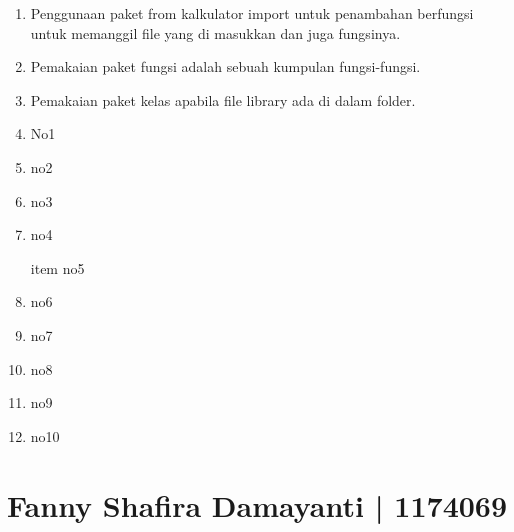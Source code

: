 \begin{enumerate}
\item Penggunaan paket from kalkulator import untuk penambahan berfungsi untuk memanggil file yang di masukkan dan juga fungsinya.


\item Pemakaian paket fungsi adalah sebuah kumpulan fungsi-fungsi.

\item Pemakaian paket kelas apabila file library ada di dalam folder.


\item No1


\item no2


\item no3


\item no4


item no5


\item no6


\item no7


\item no8


\item no9


\item no10



\end{enumerate}

\section{Fanny Shafira Damayanti | 1174069}
